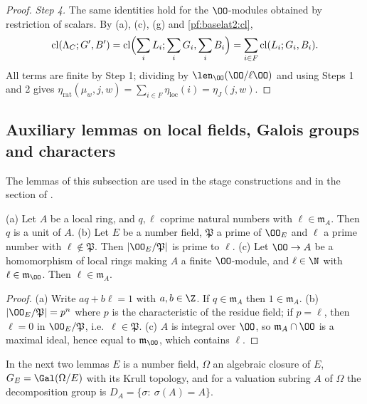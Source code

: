 \begin{proof}
\emph{Step 4.} The same identities hold for the $\OO$-modules obtained by restriction of scalars. By (a), (c),
(g) and \cref{pf:baselat2:cl},
\[
  \mathrm{cl}(\Lambda_C;G',B')=\mathrm{cl}\Bigl(\sum_iL_i;\sum_iG_i,\sum_iB_i\Bigr)=\sum_{i\in F}\mathrm{cl}(L_i;G_i,B_i).
\]
All terms are finite by Step 1; dividing by $\len_\OO(\OO/\ell\OO)$ and using Steps 1 and 2 gives
$\eta_{\mathrm{rat}}(\mu_w,j,w)=\sum_{i\in F}\eta_{\mathrm{loc}}(i)=\eta_J(j,w)$.
\end{proof}

\subsection{Auxiliary lemmas on local fields, Galois groups and characters}\label{sec:pf:baselat2:aux}

The lemmas of this subsection are used in the stage constructions and in the section of
.

\begin{lemma}\label{pf:baselat2:resunit}
\textup{(a)} Let $A$ be a local ring, and $q,\ell$ coprime natural numbers with $\ell\in\mathfrak m_A$. Then $q$ is a unit of
$A$.
\textup{(b)} Let $E$ be a number field, $\mathfrak P$ a prime of $\OO_E$ and $\ell$ a prime number with $\ell\notin\mathfrak P$. Then
$|\OO_E/\mathfrak P|$ is prime to $\ell$.
\textup{(c)} Let $\OO\to A$ be a homomorphism of local rings making $A$ a finite $\OO$-module, and $\ell\in\N$ with
$\ell\in\mathfrak m_{\OO}$. Then $\ell\in\mathfrak m_A$.
\end{lemma}

\begin{proof}
(a) Write $aq+b\ell=1$ with $a,b\in\Z$. If $q\in\mathfrak m_A$ then $1\in\mathfrak m_A$. (b) $|\OO_E/\mathfrak P|=p^n$ where
$p$ is the characteristic of the residue field; if $p=\ell$, then $\ell=0$ in $\OO_E/\mathfrak P$, i.e.\ $\ell\in\mathfrak P$.
(c) $A$ is integral over $\OO$, so $\mathfrak m_A\cap\OO$ is a maximal ideal, hence equal to $\mathfrak m_\OO$, which
contains $\ell$.
\end{proof}

In the next two lemmas $E$ is a number field, $\Omega$ an algebraic closure of $E$, $G_E=\Gal(\Omega/E)$ with
its Krull topology, and for a valuation subring $A$ of $\Omega$ the decomposition group is
$D_A=\{\sigma:\ \sigma(A)=A\}$.

